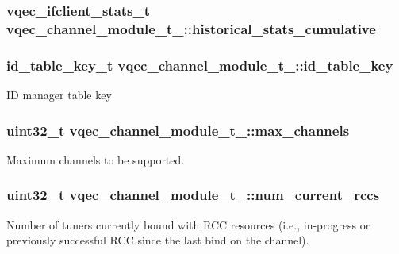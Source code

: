 \subsubsection{\setlength{\rightskip}{0pt plus 5cm}\bf{vqec\_\-ifclient\_\-stats\_\-t} \bf{vqec\_\-channel\_\-module\_\-t\_\-::historical\_\-stats\_\-cumulative}}\label{structvqec__channel__module__t___b3ae7932c0ee7f2acc751eff42d4d3cb}


\subsubsection{\setlength{\rightskip}{0pt plus 5cm}id\_\-table\_\-key\_\-t \bf{vqec\_\-channel\_\-module\_\-t\_\-::id\_\-table\_\-key}}\label{structvqec__channel__module__t___33846536ceac709aaa26a66e916e1fd6}


ID manager table key 
\subsubsection{\setlength{\rightskip}{0pt plus 5cm}uint32\_\-t \bf{vqec\_\-channel\_\-module\_\-t\_\-::max\_\-channels}}\label{structvqec__channel__module__t___bf3384306988dd2e71807f8b84517f45}


Maximum channels to be supported. 
\subsubsection{\setlength{\rightskip}{0pt plus 5cm}uint32\_\-t \bf{vqec\_\-channel\_\-module\_\-t\_\-::num\_\-current\_\-rccs}}\label{structvqec__channel__module__t___c0508975e459c3b0817ec2069ff37001}


Number of tuners currently bound with RCC resources (i.e., in-progress or previously successful RCC since the last bind on the channel). 
